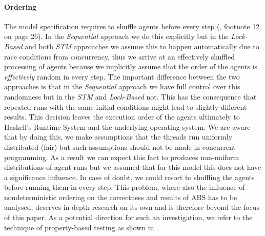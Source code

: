 
\paragraph{Ordering} The model specification requires to shuffle agents before every step (\cite{epstein_growing_1996}, footnote 12 on page 26). In the \textit{Sequential} approach we do this explicitly but in the \textit{Lock-Based} and both \textit{STM} approaches we assume this to happen automatically due to race conditions from concurrency, thus we arrive at an effectively shuffled processing of agents because we implicitly assume that the order of the agents is \textit{effectively} random in every step. The important difference between the two approaches is that in the \textit{Sequential} approach we have full control over this randomness but in the \textit{STM} and \textit{Lock-Based} not. This has the consequence that repeated runs with the same initial conditions might lead to slightly different results. 
This decision leaves the execution order of the agents ultimately to Haskell's Runtime System and the underlying operating system. We are aware that by doing this, we make assumptions that the threads run uniformly distributed (fair) but such assumptions should not be made in concurrent programming. As a result we can expect this fact to produces non-uniform distributions of agent runs but we assumed that for this model this does not have a significance influence. In case of doubt, we could resort to shuffling the agents before running them in every step. This problem, where also the influence of nondeterministic ordering on the correctness and results of ABS has to be analysed, deserves in-depth research on its own and is therefore beyond the focus of this paper. As a potential direction for such an investigation, we refer to the technique of property-based testing as shown in \cite{thaler_show_2019}.

